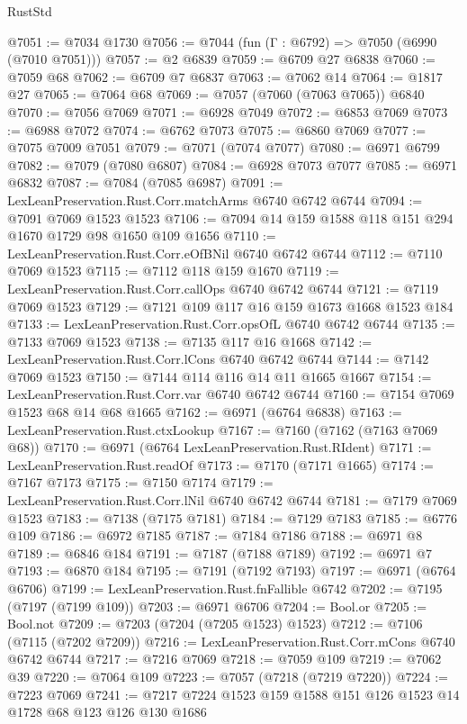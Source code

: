 \begin{lexlean}{RustStd}
\begin{coremodule}
@7051 := @7034 @1730
@7056 := @7044 (fun (Γ : @6792) => @7050 (@6990 (@7010 @7051)))
@7057 := @2 @6839
@7059 := @6709 @27 @6838
@7060 := @7059 @68
@7062 := @6709 @7 @6837
@7063 := @7062 @14
@7064 := @1817 @27
@7065 := @7064 @68
@7069 := @7057 (@7060 (@7063 @7065)) @6840
@7070 := @7056 @7069
@7071 := @6928 @7049
@7072 := @6853 @7069
@7073 := @6988 @7072
@7074 := @6762 @7073
@7075 := @6860 @7069
@7077 := @7075 @7009 @7051
@7079 := @7071 (@7074 @7077)
@7080 := @6971 @6799
@7082 := @7079 (@7080 @6807)
@7084 := @6928 @7073 @7077
@7085 := @6971 @6832
@7087 := @7084 (@7085 @6987)
@7091 := LexLeanPreservation.Rust.Corr.matchArms @6740 @6742 @6744
@7094 := @7091 @7069 @1523 @1523
@7106 := @7094 @14 @159 @1588 @118 @151 @294 @1670 @1729 @98 @1650 @109 @1656
@7110 := LexLeanPreservation.Rust.Corr.eOfBNil @6740 @6742 @6744
@7112 := @7110 @7069 @1523
@7115 := @7112 @118 @159 @1670
@7119 := LexLeanPreservation.Rust.Corr.callOps @6740 @6742 @6744
@7121 := @7119 @7069 @1523
@7129 := @7121 @109 @117 @16 @159 @1673 @1668 @1523 @184
@7133 := LexLeanPreservation.Rust.Corr.opsOfL @6740 @6742 @6744
@7135 := @7133 @7069 @1523
@7138 := @7135 @117 @16 @1668
@7142 := LexLeanPreservation.Rust.Corr.lCons @6740 @6742 @6744
@7144 := @7142 @7069 @1523
@7150 := @7144 @114 @116 @14 @11 @1665 @1667
@7154 := LexLeanPreservation.Rust.Corr.var @6740 @6742 @6744
@7160 := @7154 @7069 @1523 @68 @14 @68 @1665
@7162 := @6971 (@6764 @6838)
@7163 := LexLeanPreservation.Rust.ctxLookup
@7167 := @7160 (@7162 (@7163 @7069 @68))
@7170 := @6971 (@6764 LexLeanPreservation.Rust.RIdent)
@7171 := LexLeanPreservation.Rust.readOf
@7173 := @7170 (@7171 @1665)
@7174 := @7167 @7173
@7175 := @7150 @7174
@7179 := LexLeanPreservation.Rust.Corr.lNil @6740 @6742 @6744
@7181 := @7179 @7069 @1523
@7183 := @7138 (@7175 @7181)
@7184 := @7129 @7183
@7185 := @6776 @109
@7186 := @6972 @7185
@7187 := @7184 @7186
@7188 := @6971 @8
@7189 := @6846 @184
@7191 := @7187 (@7188 @7189)
@7192 := @6971 @7
@7193 := @6870 @184
@7195 := @7191 (@7192 @7193)
@7197 := @6971 (@6764 @6706)
@7199 := LexLeanPreservation.Rust.fnFallible @6742
@7202 := @7195 (@7197 (@7199 @109))
@7203 := @6971 @6706
@7204 := Bool.or
@7205 := Bool.not
@7209 := @7203 (@7204 (@7205 @1523) @1523)
@7212 := @7106 (@7115 (@7202 @7209))
@7216 := LexLeanPreservation.Rust.Corr.mCons @6740 @6742 @6744
@7217 := @7216 @7069
@7218 := @7059 @109
@7219 := @7062 @39
@7220 := @7064 @109
@7223 := @7057 (@7218 (@7219 @7220))
@7224 := @7223 @7069
@7241 := @7217
    @7224
    @1523
    @159
    @1588
    @151
    @126
    @1523
    @14
    @1728
    @68
    @123
    @126
    @130
    @1686

\end{coremodule}
\end{lexlean}
